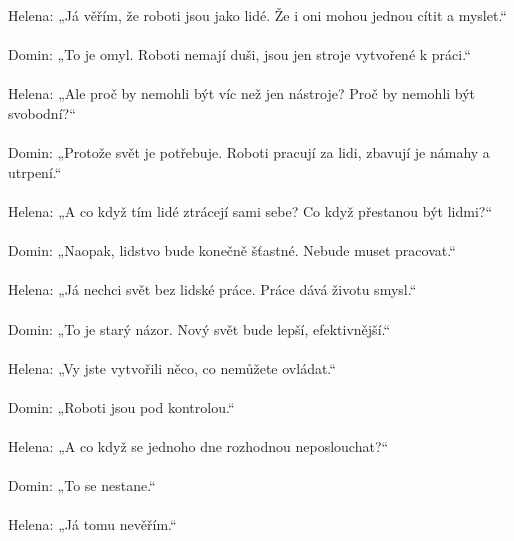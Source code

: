 \documentclass[12pt,a4paper]{article}
\begin{document}
Helena: „Já věřím, že roboti jsou jako lidé. Že i oni mohou jednou cítit a myslet.“\\
\\
Domin: „To je omyl. Roboti nemají duši, jsou jen stroje vytvořené k práci.“\\
\\
Helena: „Ale proč by nemohli být víc než jen nástroje? Proč by nemohli být svobodní?“\\
\\
Domin: „Protože svět je potřebuje. Roboti pracují za lidi, zbavují je námahy a utrpení.“\\
\\
Helena: „A co když tím lidé ztrácejí sami sebe? Co když přestanou být lidmi?“\\
\\
Domin: „Naopak, lidstvo bude konečně šťastné. Nebude muset pracovat.“\\
\\
Helena: „Já nechci svět bez lidské práce. Práce dává životu smysl.“\\
\\
Domin: „To je starý názor. Nový svět bude lepší, efektivnější.“\\
\\
Helena: „Vy jste vytvořili něco, co nemůžete ovládat.“\\
\\
Domin: „Roboti jsou pod kontrolou.“\\
\\
Helena: „A co když se jednoho dne rozhodnou neposlouchat?“\\
\\
Domin: „To se nestane.“\\
\\
Helena: „Já tomu nevěřím.“\\
\end{document}
